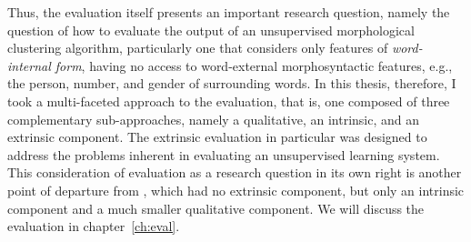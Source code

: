 Thus, the evaluation itself presents an important research question, namely the question of how to evaluate the output of an unsupervised morphological clustering algorithm, particularly one that considers only features of \emph{word-internal form}, having no access to word-external morphosyntactic features, e.g., the person, number, and gender of surrounding words. In this thesis, therefore, I took a multi-faceted approach to the evaluation, that is, one composed of three complementary sub-approaches, namely a qualitative, an intrinsic, and an extrinsic component. The extrinsic evaluation in particular was designed to address the problems inherent in evaluating an unsupervised learning system. This consideration of evaluation as a research question in its own right is another point of departure from \citet{meyer-and-dickinson:2016}, which had no extrinsic component, but only an intrinsic component and a much smaller qualitative component. We will discuss the evaluation in chapter~\ref{ch:eval}.

%

